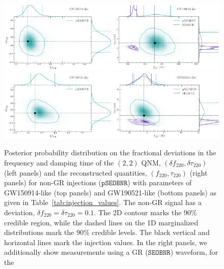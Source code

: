 \documentclass[twocolumn,prd,aps,superscriptaddress,preprintnumbers,tightenlines,showpacs,nofootinbib,eqsecnum,amsfonts,amsmath]{revtex4-1}
\newcommand{\df}[1]{\delta f_{\text{#1}}}
\newcommand{\dtau}[1]{\delta \tau_{\text{#1}}}
\newcommand{\fngr}[1]{f_{\text{#1}}}
\newcommand{\taungr}[1]{\tau_{\text{#1}}}
\newcommand{\pSEOB}{\texttt{pSEOBNR}}
\newcommand{\SEOB}{\texttt{SEOBNR}}
\begin{document}
\begin{figure}%
\begin{center}
        \includegraphics[width=0.5\textwidth]{figures/GW150914_simulated_signal_0p1_deltaf220_deltatau220.png}\includegraphics[width=0.5\textwidth]{figures/GW150914_simulated_signal_0p1_gr_ngr_fngrtaungr.png}
        \includegraphics[width=0.5\textwidth]{figures/GW190521_simulated_signal_0p1_deltaf220_deltatau220.png}\includegraphics[width=0.5\textwidth]{figures/GW190521_simulated_signal_0p1_gr_ngr_fngrtaungr.png}
        \caption{Posterior probability distribution on the fractional deviations in the frequency and damping time of the $(2,2)$ QNM, $(\df{220},\dtau{220})$ (left panels) and the reconstructed quantities, $(\fngr{220}, \taungr{220})$ (right panels) for non-GR injections ($\pSEOB$) with parameters of GW150914-like (top panels) and GW190521-like (bottom panels) as given in Table~\ref{tab:injection_values}. The non-GR signal has a deviation, $\df{220} = \dtau{220} = 0.1$. The 2D contour marks the 90\% credible region, while the dashed lines on the 1D marginalized distributions mark the 90\% credible levels. The black vertical and horizontal lines mark the injection values. In the right panels, we additionally show measurements using a GR ($\SEOB$) waveform, for the
}
\end{center}
\end{figure}
\end{document}
